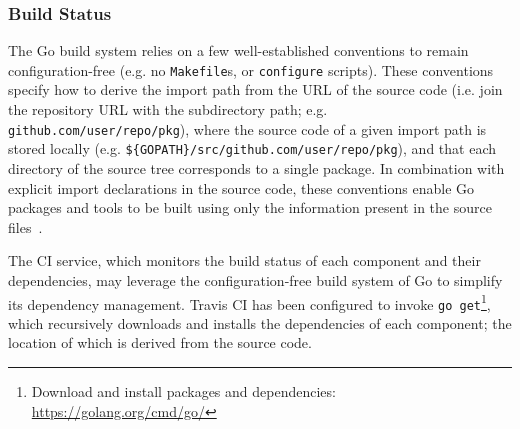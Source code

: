 
\subsubsection{Build Status}

The Go build system relies on a few well-established conventions to remain configuration-free (e.g. no \texttt{Makefile}s, or \texttt{configure} scripts). These conventions specify how to derive the import path from the URL of the source code (i.e. join the repository URL with the subdirectory path; e.g. \texttt{github.com/user/repo/pkg}), where the source code of a given import path is stored locally (e.g. \texttt{\$\{GOPATH\}/src/github.com/user/repo/pkg}), and that each directory of the source tree corresponds to a single package. In combination with explicit import declarations in the source code, these conventions enable Go packages and tools to be built using only the information present in the source files~\cite{go_command}.

The CI service, which monitors the build status of each component and their dependencies, may leverage the configuration-free build system of Go to simplify its dependency management. Travis CI has been configured to invoke \texttt{go get}\footnote{Download and install packages and dependencies: \url{https://golang.org/cmd/go/}}, which recursively downloads and installs the dependencies of each component; the location of which is derived from the source code.
